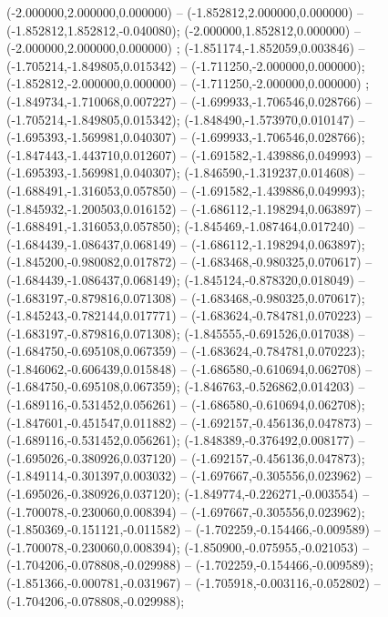  (-2.000000,2.000000,0.000000) -- (-1.852812,2.000000,0.000000) -- (-1.852812,1.852812,-0.040080);
 (-2.000000,1.852812,0.000000) -- (-2.000000,2.000000,0.000000) ;
 (-1.851174,-1.852059,0.003846) -- (-1.705214,-1.849805,0.015342) -- (-1.711250,-2.000000,0.000000);
 (-1.852812,-2.000000,0.000000) -- (-1.711250,-2.000000,0.000000) ;
 (-1.849734,-1.710068,0.007227) -- (-1.699933,-1.706546,0.028766) -- (-1.705214,-1.849805,0.015342);
 (-1.848490,-1.573970,0.010147) -- (-1.695393,-1.569981,0.040307) -- (-1.699933,-1.706546,0.028766);
 (-1.847443,-1.443710,0.012607) -- (-1.691582,-1.439886,0.049993) -- (-1.695393,-1.569981,0.040307);
 (-1.846590,-1.319237,0.014608) -- (-1.688491,-1.316053,0.057850) -- (-1.691582,-1.439886,0.049993);
 (-1.845932,-1.200503,0.016152) -- (-1.686112,-1.198294,0.063897) -- (-1.688491,-1.316053,0.057850);
 (-1.845469,-1.087464,0.017240) -- (-1.684439,-1.086437,0.068149) -- (-1.686112,-1.198294,0.063897);
 (-1.845200,-0.980082,0.017872) -- (-1.683468,-0.980325,0.070617) -- (-1.684439,-1.086437,0.068149);
 (-1.845124,-0.878320,0.018049) -- (-1.683197,-0.879816,0.071308) -- (-1.683468,-0.980325,0.070617);
 (-1.845243,-0.782144,0.017771) -- (-1.683624,-0.784781,0.070223) -- (-1.683197,-0.879816,0.071308);
 (-1.845555,-0.691526,0.017038) -- (-1.684750,-0.695108,0.067359) -- (-1.683624,-0.784781,0.070223);
 (-1.846062,-0.606439,0.015848) -- (-1.686580,-0.610694,0.062708) -- (-1.684750,-0.695108,0.067359);
 (-1.846763,-0.526862,0.014203) -- (-1.689116,-0.531452,0.056261) -- (-1.686580,-0.610694,0.062708);
 (-1.847601,-0.451547,0.011882) -- (-1.692157,-0.456136,0.047873) -- (-1.689116,-0.531452,0.056261);
 (-1.848389,-0.376492,0.008177) -- (-1.695026,-0.380926,0.037120) -- (-1.692157,-0.456136,0.047873);
 (-1.849114,-0.301397,0.003032) -- (-1.697667,-0.305556,0.023962) -- (-1.695026,-0.380926,0.037120);
 (-1.849774,-0.226271,-0.003554) -- (-1.700078,-0.230060,0.008394) -- (-1.697667,-0.305556,0.023962);
 (-1.850369,-0.151121,-0.011582) -- (-1.702259,-0.154466,-0.009589) -- (-1.700078,-0.230060,0.008394);
 (-1.850900,-0.075955,-0.021053) -- (-1.704206,-0.078808,-0.029988) -- (-1.702259,-0.154466,-0.009589);
 (-1.851366,-0.000781,-0.031967) -- (-1.705918,-0.003116,-0.052802) -- (-1.704206,-0.078808,-0.029988);
